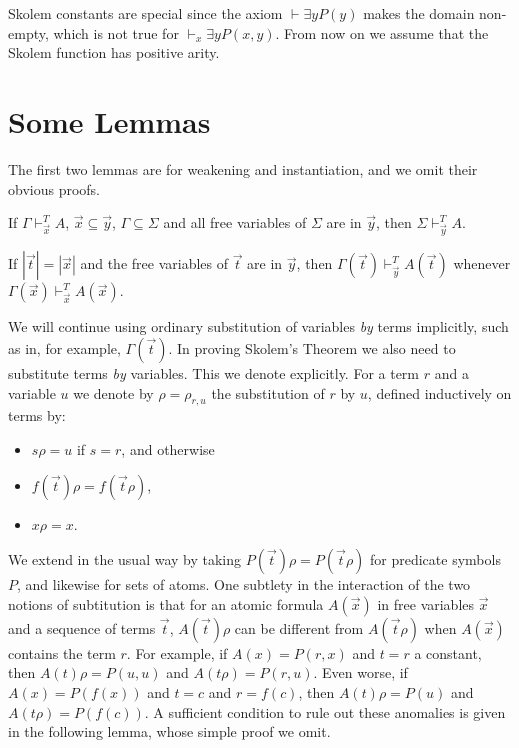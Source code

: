 \documentclass[10pt,a4paper]{article}
\begin{document}
Skolem constants are special since the axiom $\vdash\exists y P(y)$
makes the domain non-empty, which is not true for $\vdash_x\exists y P(x,y)$.
From now on we assume that the Skolem function has positive arity.

\section{Some Lemmas}\label{auxlemmas}

The first two lemmas are for weakening and instantiation, and we omit their obvious proofs.

\begin{lemma}\label{weak}
If $\Gamma\vdash_{\vec{x}}^T A$, $\vec{x}\subseteq \vec{y}$, $\Gamma\subseteq \Sigma$ and all free variables of $\Sigma$ are in $\vec{y}$, then $\Sigma\vdash_{\vec{y}}^T A$.
\end{lemma}

\begin{lemma}\label{subst1}
If $|\vec{t}| =|\vec{x}|$ and the free variables of $\vec{t}$ are in $\vec{y}$, 
then $\Gamma(\vec{t})\vdash_{\vec{y}}^T A(\vec{t})$ whenever
$\Gamma(\vec{x})\vdash_{\vec{x}}^T A(\vec{x})$.
\end{lemma}

We will continue using ordinary substitution of variables \emph{by} terms implicitly, 
such as in, for example, $\Gamma(\vec{t})$. 
In proving Skolem's Theorem we also need to
substitute terms \emph{by} variables. This we denote explicitly.
For a term $r$ and a variable $u$ we denote by $\rho = \rho_{r,u}$ the 
substitution of $r$ by $u$, defined inductively on terms by:
\begin{itemize}
\item $s\rho = u$ if $s = r$, and otherwise
\item $f(\vec{t})\rho = f(\vec{t}\rho)$,
\item $x\rho = x$.
\end{itemize}
We extend in the usual way by taking $P(\vec{t})\rho = P(\vec{t}\rho)$ for
predicate symbols  $P$, and likewise for sets of atoms. 
One subtlety in the interaction of the two notions of subtitution is that for an
atomic formula $A(\vec{x})$ in free variables $\vec{x}$ and
a sequence of terms $\vec{t}$, $A(\vec{t})\rho$
can be different from $A(\vec{t}\rho)$ when $A(\vec{x})$
contains the term $r$. For example, if  $A(x) = P(r,x)$
and $t=r$ a constant, then $A(t)\rho = P(u,u)$ and $A(t\rho) = P(r,u)$.
Even worse, if $A(x) = P(f(x))$ and $t=c$ and $r=f(c)$,
then $A(t)\rho = P(u)$ and $A(t\rho) = P(f(c))$.
A sufficient condition to rule out these anomalies is given in
the following lemma, whose simple proof we omit.
\end{document}

